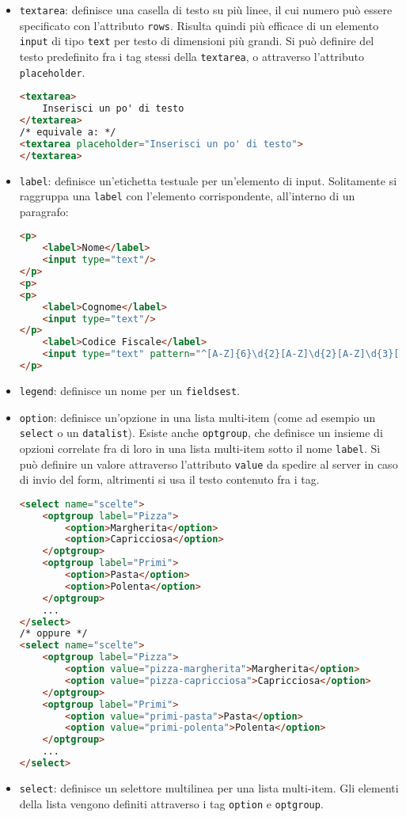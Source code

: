 \documentclass[a4paper,11pt]{article}
\begin{document}
\begin{itemize}
	\item \lstinline|textarea|: definisce una casella di testo su più linee, il cui numero può essere specificato con l'attributo \lstinline|rows|. Risulta quindi più efficace di un elemento \lstinline|input| di tipo \lstinline|text| per testo di dimensioni più grandi. Si può definire del testo predefinito fra i tag stessi della \lstinline|textarea|, o attraverso l'attributo \lstinline|placeholder|.
\begin{lstlisting}[language=html, style=codestyle]	
<textarea>
	Inserisci un po' di testo
</textarea>
/* equivale a: */
<textarea placeholder="Inserisci un po' di testo">
</textarea>
\end{lstlisting}

	\item \lstinline|label|: definisce un'etichetta testuale per un'elemento di input.
		Solitamente si raggruppa una \lstinline|label| con l'elemento corrispondente, all'interno di un paragrafo:
\begin{lstlisting}[language=html, style=codestyle]	
<p>
	<label>Nome</label>
	<input type="text"/>
</p>
<p>
<p>
	<label>Cognome</label>
	<input type="text"/>
</p>
	<label>Codice Fiscale</label>
	<input type="text" pattern="^[A-Z]{6}\d{2}[A-Z]\d{2}[A-Z]\d{3}[A-Z]$"/>
</p>
\end{lstlisting}

\item \lstinline|legend|: definisce un nome per un \lstinline|fieldsest|. 

\item \lstinline|option|: definisce un'opzione in una lista multi-item (come ad esempio un \lstinline|select| o un \lstinline|datalist|). Esiste anche \lstinline|optgroup|, che definisce un insieme di opzioni correlate fra di loro in una lista multi-item sotto il nome \lstinline|label|. Si può definire un valore attraverso l'attributo \lstinline|value| da spedire al server in caso di invio del form, altrimenti si usa il testo contenuto fra i tag.
\begin{lstlisting}[language=html, style=codestyle]	
<select name="scelte">
	<optgroup label="Pizza">
		<option>Margherita</option>
		<option>Capricciosa</option>
	</optgroup>
	<optgroup label="Primi">
		<option>Pasta</option>
		<option>Polenta</option>
	</optgroup>
	...
</select>
/* oppure */
<select name="scelte">
	<optgroup label="Pizza">
		<option value="pizza-margherita">Margherita</option>
		<option value="pizza-capricciosa">Capricciosa</option>
	</optgroup>
	<optgroup label="Primi">
		<option value="primi-pasta">Pasta</option>
		<option value="primi-polenta">Polenta</option>
	</optgroup>
	...
</select>
\end{lstlisting}

\item \lstinline|select|: definisce un selettore multilinea per una lista multi-item. Gli elementi della lista vengono definiti attraverso i tag \lstinline|option| e \lstinline|optgroup|.

\end{itemize}
\end{document}

